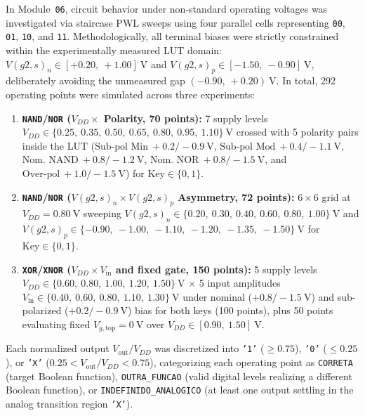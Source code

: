 In Module~\texttt{06}, circuit behavior under non-standard operating voltages was investigated via staircase PWL sweeps using four parallel cells representing \texttt{00}, \texttt{01}, \texttt{10}, and \texttt{11}. Methodologically, all terminal biases were strictly constrained within the experimentally measured LUT domain: $V(g2,s)_n \in [+0.20,\ +1.00]\ \text{V}$ and $V(g2,s)_p \in [-1.50,\ -0.90]\ \text{V}$, deliberately avoiding the unmeasured gap $(-0.90,\ +0.20)\ \text{V}$. In total, 292 operating points were simulated across three experiments:
\begin{enumerate}
    \item \textbf{\texttt{NAND}/\texttt{NOR} ($V_{DD} \times$ Polarity, 70 points):} 7 supply levels $V_{DD} \in \{0.25,\allowbreak\ 0.35,\allowbreak\ 0.50,\allowbreak\ 0.65,\allowbreak\ 0.80,\allowbreak\ 0.95,\allowbreak\ 1.10\}\ \text{V}$ crossed with 5 polarity pairs inside the LUT ($\text{Sub-pol Min}\ +0.2/-0.9\ \text{V}$, $\text{Sub-pol Mod}\ +0.4/-1.1\ \text{V}$, $\text{Nom.\ NAND}\ +0.8/-1.2\ \text{V}$, $\text{Nom.\ NOR}\ +0.8/-1.5\ \text{V}$, and $\text{Over-pol}\ +1.0/-1.5\ \text{V}$) for $\text{Key} \in \{0, 1\}$.
    \item \textbf{\texttt{NAND}/\texttt{NOR} ($V(g2,s)_n \times V(g2,s)_p$ Asymmetry, 72 points):} $6 \times 6$ grid at $V_{DD} = 0.80\ \text{V}$ sweeping $V(g2,s)_n \in \{0.20,\allowbreak\ 0.30,\allowbreak\ 0.40,\allowbreak\ 0.60,\allowbreak\ 0.80,\allowbreak\ 1.00\}\ \text{V}$ and $V(g2,s)_p \in \{-0.90,\allowbreak\ -1.00,\allowbreak\ -1.10,\allowbreak\ -1.20,\allowbreak\ -1.35,\allowbreak\ -1.50\}\ \text{V}$ for $\text{Key} \in \{0, 1\}$.
    \item \textbf{\texttt{XOR}/\texttt{XNOR} ($V_{DD} \times V_{\mathrm{in}}$ and fixed gate, 150 points):} 5 supply levels $V_{DD} \in \{0.60,\allowbreak\ 0.80,\allowbreak\ 1.00,\allowbreak\ 1.20,\allowbreak\ 1.50\}\ \text{V}$ $\times$ 5 input amplitudes $V_{\mathrm{in}} \in \{0.40,\allowbreak\ 0.60,\allowbreak\ 0.80,\allowbreak\ 1.10,\allowbreak\ 1.30\}\ \text{V}$ under nominal ($+0.8/-1.5\ \text{V}$) and sub-polarized ($+0.2/-0.9\ \text{V}$) bias for both keys (100 points), plus 50 points evaluating fixed $V_{g,\mathrm{top}} = 0\ \text{V}$ over $V_{DD} \in [0.90,\ 1.50]\ \text{V}$.
\end{enumerate}
Each normalized output $V_{\mathrm{out}}/V_{DD}$ was discretized into \texttt{'1'} ($\ge 0.75$), \texttt{'0'} ($\le 0.25$), or \texttt{'X'} ($0.25 < V_{\mathrm{out}}/V_{DD} < 0.75$), categorizing each operating point as \texttt{CORRETA} (target Boolean function), \texttt{OUTRA\_\allowbreak FUNCAO} (valid digital levels realizing a different Boolean function), or \texttt{INDEFINIDO\_\allowbreak ANALOGICO} (at least one output settling in the analog transition region \texttt{'X'}).

